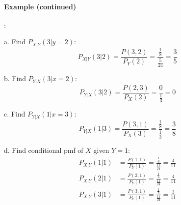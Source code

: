 \paragraph*{Example (continued)}:

a. Find $P_{X|Y}(3|y=2)$:
\[
P_{X|Y}(3|2) = \frac{P(3,2)}{P_Y(2)} = \frac{\frac{1}{8}}{\frac{5}{24}} = \frac{3}{5}
\]

b. Find $P_{Y|X}(3|x=2)$:
\[
P_{Y|X}(3|2) = \frac{P(2,3)}{P_X(2)} = \frac{0}{\frac{1}{3}} = 0
\]

c. Find $P_{Y|X}(1|x=3)$:
\[
P_{Y|X}(1|3) = \frac{P(3,1)}{P_X(3)} = \frac{\frac{1}{8}}{\frac{1}{3}} = \frac{3}{8}
\]

d. Find conditional pmf of $X$ given $Y=1$:
\begin{align*}
    P_{X|Y}(1|1) &= \frac{P(1,1)}{P_Y(1)} = \frac{\frac{1}{6}}{\frac{11}{24}} = \frac{4}{11} \\
    P_{X|Y}(2|1) &= \frac{P(2,1)}{P_Y(1)} = \frac{\frac{1}{6}}{\frac{11}{24}} = \frac{4}{11} \\
    P_{X|Y}(3|1) &= \frac{P(3,1)}{P_Y(1)} = \frac{\frac{1}{8}}{\frac{11}{24}} = \frac{3}{11}
\end{align*}